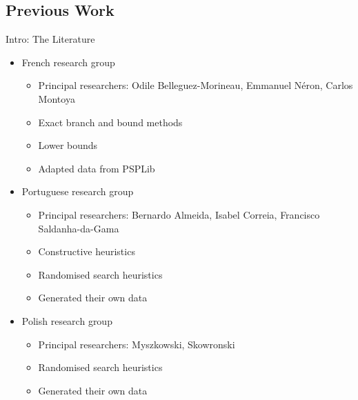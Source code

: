 \documentclass{beamer}
\begin{document}
\subsection{Previous Work}
\begin{frame}{Intro: The Literature}
	\begin{itemize}
		\item French research group
		\begin{itemize}
			\item Principal researchers: Odile Belleguez-Morineau, Emmanuel N\'{e}ron, Carlos Montoya
			\item Exact branch and bound methods
			\item Lower bounds
			\item Adapted data from PSPLib\pause
		\end{itemize}	
		\vspace{2mm}
		\item Portuguese research group
		\begin{itemize}
			\item Principal researchers: Bernardo Almeida, Isabel Correia, Francisco Saldanha-da-Gama
			\item Constructive heuristics
			\item Randomised search heuristics
			\item Generated their own data\pause
		\end{itemize}
		\vspace{2mm}
		\item Polish research group
		\begin{itemize}
			\item Principal researchers: Myszkowski, Skowronski
			\item Randomised search heuristics
			\item Generated their own data
		\end{itemize}
	\end{itemize}
\end{frame}

\end{document}
